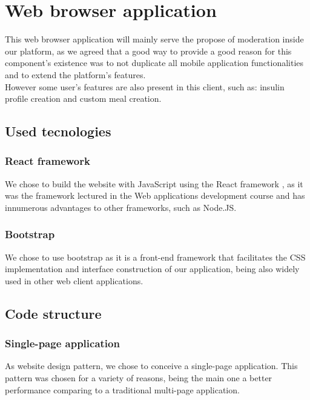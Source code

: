 \section{Web browser application}

This web browser application will mainly serve the propose of moderation inside our platform, as we agreed that a good way to provide a good reason for this 
component's existence was to not duplicate all mobile application functionalities and to extend the platform's features.\\

However some user's features are also present in this client, such as: insulin profile creation and custom meal creation.\\

\subsection{Used tecnologies}

\subsubsection{React framework}

We chose to build the website with JavaScript \cite{javascript} using the React framework \cite{react} , as it was the framework lectured in the Web applications
development course and has innumerous advantages to other frameworks, such as Node.JS.

\subsubsection{Bootstrap}

We chose to use bootstrap as it is a front-end framework that facilitates the CSS implementation and interface construction of our application, being also widely
used in other web client applications.\\

\subsection{Code structure}

\subsubsection{Single-page application}

As website design pattern, we chose to conceive a single-page application. This pattern was chosen for a 
variety of reasons, being the main one a better performance comparing to a traditional multi-page application.\\

